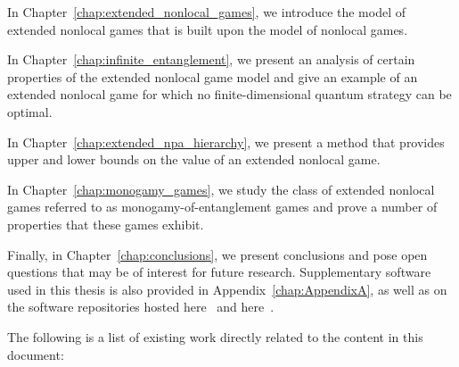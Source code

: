 
In Chapter~\ref{chap:extended_nonlocal_games}, we introduce the model of extended nonlocal games that is built upon the model of nonlocal games. 

In Chapter~\ref{chap:infinite_entanglement}, we present an analysis of certain properties of the extended nonlocal game model and give an example of an extended nonlocal game for which no finite-dimensional quantum strategy can be optimal. 

In Chapter~\ref{chap:extended_npa_hierarchy}, we present a method that provides upper and lower bounds on the value of an extended nonlocal game. 

In Chapter~\ref{chap:monogamy_games}, we study the class of extended nonlocal games referred to as monogamy-of-entanglement games and prove a number of properties that these games exhibit. 


Finally, in Chapter~\ref{chap:conclusions}, we present conclusions and pose open questions that may be of interest for future research. Supplementary software used in this thesis is also provided in Appendix~\ref{chap:AppendixA}, as well as on the software repositories hosted here~\cite{Russo2015a} and here~\cite{Russo2016a}. 

\noindent The following is a list of existing work directly related to the content in this document:

